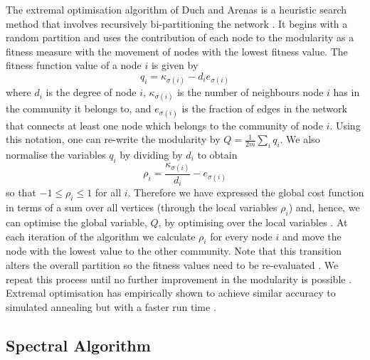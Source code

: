 The extremal optimisation algorithm of Duch and Arenas \cite{DA05} is a heuristic search method that involves recursively bi-partitioning the network \cite{DA05,For10}.
It begins with a random partition and uses the contribution of each node to the modularity as a fitness measure with the movement of nodes with the lowest fitness value.
The fitness function value of a node $i$ is given by
\begin{equation}
	\label{eq:fitnessFunction}
	q_{i} = \kappa_{\sigma(i)} - d_{i}e_{\sigma(i)}
\end{equation}
where $d_{i}$ is the degree of node $i$, $\kappa_{\sigma(i)}$ is the number of neighbours node $i$ has in the community it belongs to, and $e_{\sigma(i)}$ is the fraction of edges in the network that connects at least one node which belongs to the community of node $i$.
Using this notation, one can re-write the modularity by $Q = \frac{1}{2m} \sum_{i} q_{i}$.
We also normalise the variables $q_{i}$ by dividing by $d_{i}$ to obtain
\begin{equation}
	\label{eq:normalisedFitnessFunction}
	\rho_{i} = \frac{\kappa_{\sigma(i)}}{d_{i}} - e_{\sigma(i)}
\end{equation}
so that $-1 \leq \rho_{i}  \leq 1$ for all $i$.
Therefore we have expressed the global cost function in terms of a sum over all vertices (through the local variables $\rho_{i}$) and, hence, we can optimise the global variable, $Q$, by optimising over the local variables \cite{For10}.
At each iteration of the algorithm we calculate $\rho_{i}$ for every node $i$ and move the node with the lowest value to the other community.
Note that this transition alters the overall partition so the fitness values need to be re-evaluated \cite{DA05,For10}.
We repeat this process until no further improvement in the modularity is possible \cite{DA05,For10}.
Extremal optimisation has empirically shown to achieve similar accuracy to simulated annealing but with a faster run time \cite{For10}.


\subsection{Spectral Algorithm}
\label{subsec:spectralAlgorithm}

